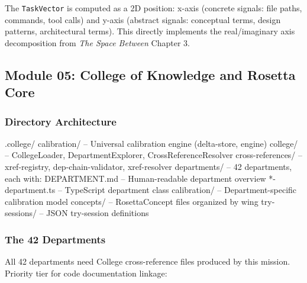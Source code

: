 \documentclass[11pt,letterpaper]{article}
\begin{document}
The \texttt{TaskVector} is computed as a 2D position: x-axis (concrete signals: file paths, commands, tool calls) and y-axis (abstract signals: conceptual terms, design patterns, architectural terms). This directly implements the real/imaginary axis decomposition from \textit{The Space Between} Chapter 3.

\subsection{Module 05: College of Knowledge and Rosetta Core}

\subsubsection{Directory Architecture}

\begin{asciibox}
.college/
  calibration/          -- Universal calibration engine (delta-store, engine)
  college/              -- CollegeLoader, DepartmentExplorer, CrossReferenceResolver
  cross-references/     -- xref-registry, dep-chain-validator, xref-resolver
  departments/          -- 42 departments, each with:
      DEPARTMENT.md     -- Human-readable department overview
      *-department.ts   -- TypeScript department class
      calibration/      -- Department-specific calibration model
      concepts/         -- RosettaConcept files organized by wing
      try-sessions/     -- JSON try-session definitions
\end{asciibox}

\subsubsection{The 42 Departments}

All 42 departments need College cross-reference files produced by this mission. Priority tier for code documentation linkage:
\end{document}
